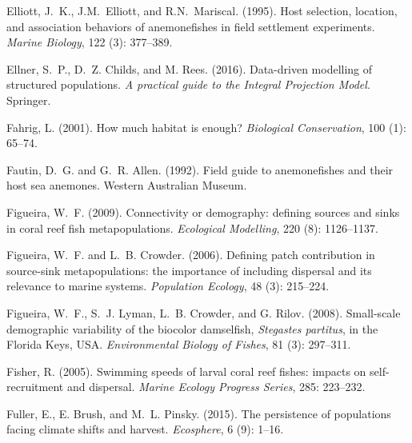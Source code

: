 \documentclass[12pt, oneside]{article}   	%
\begin{document}
\begin{thebibliography}{66}
Elliott, J.~K., J.M.~Elliott, and R.N.~Mariscal. (1995).
\newblock Host selection, location, and association behaviors of anemonefishes
  in field settlement experiments.
\newblock \emph{Marine Biology}, 122 (3): 377--389.

Ellner, S.~P., D.~Z. Childs, and M. Rees. (2016).
\newblock Data-driven modelling of structured populations.
\newblock \emph{A practical guide to the Integral Projection Model}. Springer.

Fahrig, L. (2001).
\newblock How much habitat is enough?
\newblock \emph{Biological Conservation}, 100 (1): 65--74.

Fautin, D.~G. and G.~R. Allen. (1992).
\newblock Field guide to anemonefishes and their host sea anemones.
\newblock Western Australian Museum.

Figueira, W.~F. (2009).
\newblock Connectivity or demography: defining sources and sinks in coral reef
  fish metapopulations.
\newblock \emph{Ecological Modelling}, 220 (8): 1126--1137.

Figueira, W.~F. and L.~B. Crowder. (2006).
\newblock Defining patch contribution in source-sink metapopulations: the
  importance of including dispersal and its relevance to marine systems.
\newblock \emph{Population Ecology}, 48 (3): 215--224.

Figueira, W.~F., S.~J. Lyman, L.~B. Crowder, and G. Rilov. (2008).
\newblock Small-scale demographic variability of the biocolor damselfish,
  \textit{Stegastes partitus}, in the Florida Keys, USA.
\newblock \emph{Environmental Biology of Fishes}, 81 (3):
  297--311.

Fisher, R. (2005).
\newblock Swimming speeds of larval coral reef fishes: impacts on
  self-recruitment and dispersal.
\newblock \emph{Marine Ecology Progress Series}, 285: 223--232.

Fuller, E., E. Brush, and M.~L. Pinsky. (2015).
\newblock The persistence of populations facing climate shifts and harvest.
\newblock \emph{Ecosphere}, 6 (9): 1--16.


\end{thebibliography}
\end{document}
